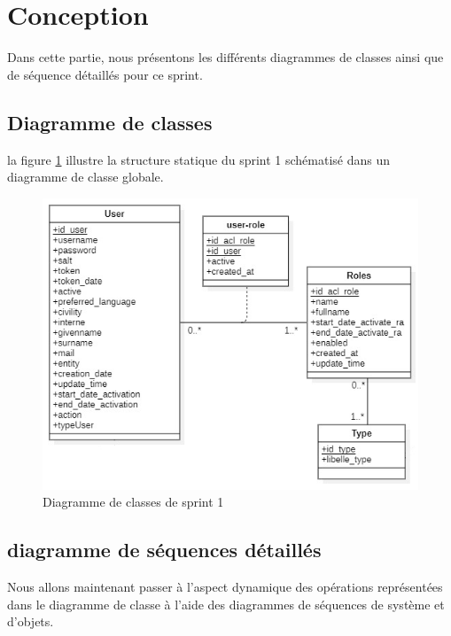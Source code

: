 \section{Conception}
Dans cette partie, nous présentons les différents diagrammes de classes ainsi que de séquence détaillés pour ce sprint.
\subsection{Diagramme de classes}
la figure \ref{fig:classdiag-sprint1} illustre la structure statique du sprint 1 schématisé dans un diagramme de classe globale.
\begin{figure}[H]
	\centering
	\includegraphics[width=0.7\linewidth]{img/conception/classes/ClassDiag-sprint1}
	\caption[Diagramme de classes de sprint 1]{Diagramme de classes de sprint 1}
	\label{fig:classdiag-sprint1}
\end{figure}
\subsection{diagramme de séquences détaillés}
Nous allons maintenant passer à l’aspect dynamique des opérations représentées dans le diagramme de classe à l’aide des diagrammes de séquences de système et d’objets.
